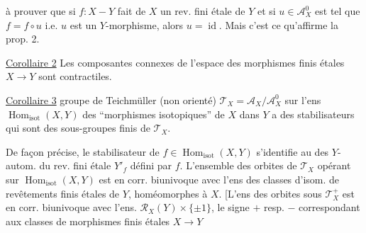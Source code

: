 à prouver que si $f:X\mathbin{-}Y$ fait de $X$ un rev. fini étale de $Y$ et si $u\in\mathcal{A}_X^0$ est tel que $f=f\circ u$ i.e. $u$ est un $Y$-morphisme, alors $u=\operatorname{id}$. Mais c'est ce qu'affirme la prop. 2.

\uline{Corollaire 2} Les composantes connexes de l'espace des morphismes finis étales $X\longrightarrow Y$ sont contractiles.

\uline{Corollaire 3}   groupe de Teichmüller (non orienté) $\mathcal{T}_X=\mathcal{A}_X/\mathcal{A}_X^0$ sur l'ens $\operatorname{Hom}_{\mathrm{isot}}(X,Y)$ des ``morphismes isotopiques'' de $X$ dans $Y$  a des stabilisateurs qui sont des sous-groupes finis de $\mathcal{T}_X$.

De façon précise, le stabilisateur de $f\in\operatorname{Hom}_{\mathrm{isot}}(X,Y)$ s'identifie au    des $Y$-autom. du rev. fini étale $Y'_f$ défini par $f$. L'ensemble des orbites de $\mathcal{T}_X$ opérant sur $\operatorname{Hom}_{\mathrm{isot}}(X,Y)$ est en corr. biunivoque avec l'ens  des classes d'isom. de revêtements finis étales de $Y$, homéomorphes à $X$.
[L'ens des orbites sous $\mathcal{T}_X^+$ est en corr. biunivoque avec l'ens. $\mathcal{R}_X(Y)\times\{\pm1\}$, le signe $+$ resp. $-$ correspondant aux classes de morphismes finis étales $X\longrightarrow Y$
